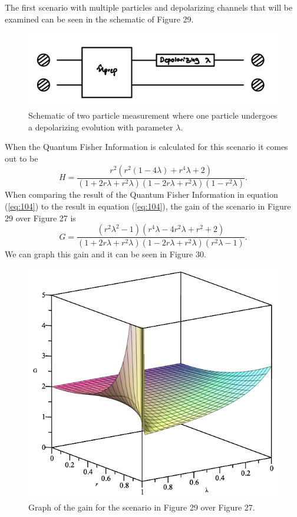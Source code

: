 \documentclass[twocolumn]{article}
\begin{document}
The first scenario with multiple particles and depolarizing channels that will be examined can be seen in the schematic of Figure 29.
\newpage
\begin{figure}[h]
\begin{center}
\includegraphics[width=0.65\linewidth]{Depolarizing-Double-Channel-Lambda-Schematic.jpg}
\caption{Schematic of two particle measurement where one particle undergoes a depolarizing evolution with parameter $\lambda$.}
\end{center}
\end{figure}
When the Quantum Fisher Information is calculated for this scenario it comes out to be
\begin{equation}\label{eq:104}
H=\frac{r^2(r^2(1-4\lambda)+r^4\lambda+2)}{(1+2r\lambda+r^2\lambda)(1-2r\lambda+r^2\lambda)(1-r^2\lambda)}.
\end{equation}
When comparing the result of the Quantum Fisher Information in equation (\ref{eq:104}) to the result in equation (\ref{eq:104}), the gain of the scenario in Figure 29 over Figure 27 is
\begin{equation}\label{eq:105}
G=\frac{(r^2\lambda^2-1)(r^4\lambda-4r^2\lambda+r^2+2)}{(1+2r\lambda+r^2\lambda)(1-2r\lambda+r^2\lambda)(r^2\lambda-1)}.
\end{equation}
We can graph this gain and it can be seen in Figure 30.
\begin{figure}[h]
\begin{center}
\includegraphics[width=0.65\linewidth]{Depolarizing-Double-Channel-Lambda-Gain-Graph.png}
\caption{Graph of the gain for the scenario in Figure 29 over Figure 27.}
\end{center}
\end{figure}
\end{document}
